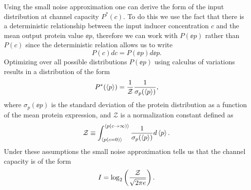 Using the small noise approximation one can derive the form of the input
distribution at channel capacity $P^*(c)$. To do this we use the fact that
there is a deterministic relationship between the input inducer concentration
$c$ and the mean output protein value  $\ee{p}$, therefore we can work with
$P(\ee{p})$ rather than $P(c)$ since the deterministic relation allows us to
write
\begin{equation}
  P(c) dc = P(\ee{p}) d\ee{p}.
\end{equation}
Optimizing over all possible distributions $P(\ee{p})$ using calculus of
variations results in a distribution of the form
\begin{equation}
  P^*(\left\langle p \right\rangle) = {1 \over \mathcal{Z}} {1 \over \sigma_p(\left\langle p \right\rangle)},
\end{equation}
where $\sigma_p(\ee{p})$ is the standard deviation of the protein distribution
as a function of the mean protein expression, and $\mathcal{Z}$ is a
normalization constant defined as
\begin{equation}
  \mathcal{Z} \equiv \int_{\left\langle p(c=0) \right\rangle}^{\left\langle p(c\rightarrow \infty) \right\rangle}
  {1 \over \sigma_p(\left\langle p \right\rangle)} d\left\langle p \right\rangle.
\end{equation}
Under these assumptions the small noise approximation tells us that the channel
capacity is of the form \cite{Tkacik2008a}
\begin{equation}
  I = \log_2 \left( {\mathcal{Z} \over \sqrt{2 \pi e}} \right).
\end{equation}


